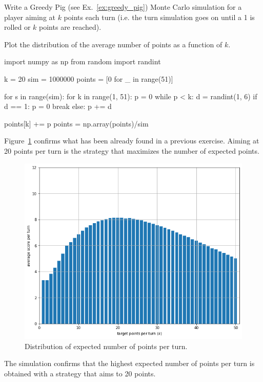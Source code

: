 \begin{question}
Write a Greedy Pig (see Ex.~\ref{ex:greedy_pig}) Monte Carlo simulation for a player aiming at $k$ points each turn (i.e. the turn simulation goes on until a 1 is rolled or $k$ points are reached).

Plot the distribution of the average number of points as a function of $k$.
\end{question}
\cprotEnv\begin{solution}
\begin{ipython}
import numpy as np
from random import randint

k = 20
sim = 1000000
points = [0 for _ in range(51)]

for s in range(sim):
    for k in range(1, 51):
        p = 0 
        while p < k:
            d = randint(1, 6)
            if d == 1:
                p = 0
                break
            else:
                p += d

points[k] += p
points = np.array(points)/sim
\end{ipython}

Figure~\ref{fig:greedy_pig_sim} confirms what has been already found in a previous exercise. Aiming at 20 points per turn is the strategy that maximizes the number of expected points.

\begin{figure}[htbp]
	\begin{center}
		\includegraphics[width=0.7\linewidth]{figures/greedy_pig_sim}
	\end{center}
\caption{Distribution of expected number of points per turn.}
\label{fig:greedy_pig_sim}
\end{figure}

The simulation confirms that the highest expected number of points per turn is obtained with a strategy that aims to 20 points.
\end{solution}


